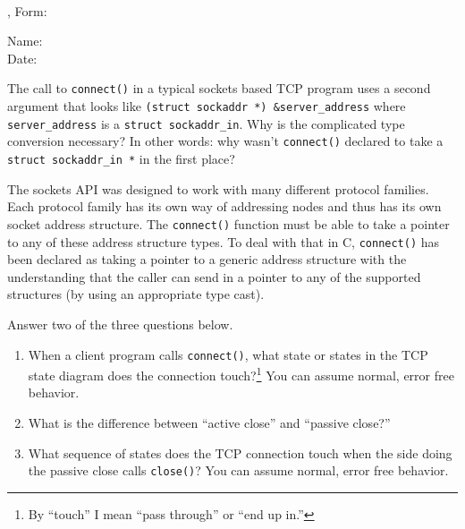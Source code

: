 \documentclass[12pt]{examdesign}
\begin{document}
%
\begin{examtop}
  \parbox{3in}{\classdata \\
               \examtype, Form: }
  \hfill
  \parbox{3in}{\normalsize Name: \hrulefill \\[2.0ex]
                           Date: \hrulefill }
  \bigskip
\end{examtop}

\begin{shortanswer}

  \begin{question}
    The call to \texttt{connect()} in a typical sockets based TCP program uses a second argument
    that looks like \texttt{(struct sockaddr *) \&server\_address} where
    \texttt{server\_address} is a \texttt{struct sockaddr\_in}. Why is the complicated type
    conversion necessary? In other words: why wasn't \texttt{connect()} declared to take a
    \texttt{struct sockaddr\_in *} in the first place?

    \begin{answer}
      The sockets API was designed to work with many different protocol families. Each protocol
      family has its own way of addressing nodes and thus has its own socket address structure.
      The \texttt{connect()} function must be able to take a pointer to any of these address
      structure types. To deal with that in C, \texttt{connect()} has been declared as taking a
      pointer to a generic address structure with the understanding that the caller can send in
      a pointer to any of the supported structures (by using an appropriate type cast).
    \end{answer}
  \end{question}


  \begin{question}
  	Answer two of the three questions below.
    \begin{enumerate}
    \item When a client program calls \texttt{connect()}, what state or states in the TCP state
      diagram does the connection touch?\footnote{By ``touch'' I mean ``pass through'' or ``end
        up in.''} You can assume normal, error free behavior.
    \item What is the difference between ``active close'' and ``passive close?''
    \item What sequence of states does the TCP connection touch when the side doing the passive
      close calls \texttt{close()}? You can assume normal, error free behavior.
    \end{enumerate}
    

\end{question}
\end{shortanswer}
\end{document}
